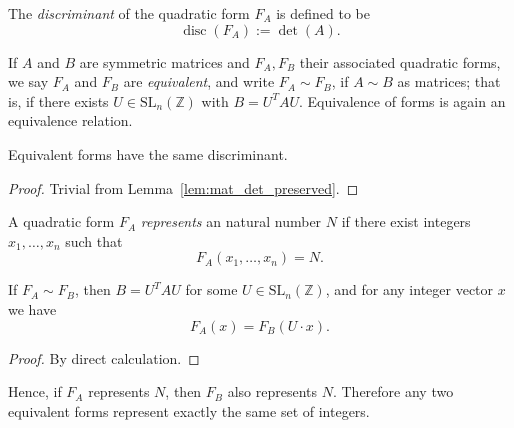 The \emph{discriminant} of the quadratic form $F_A$ is defined to be
\[ \operatorname{disc}(F_A) := \det(A). \]

\begin{definition}
\label{def:QuadMap_equiv}
\leanok
If $A$ and $B$ are symmetric matrices and $F_A, F_B$ their associated
quadratic forms, we say $F_A$ and $F_B$ are \emph{equivalent}, and write
$F_A\sim F_B$, if $A\sim B$ as matrices; that is, if there exists
$U\in\mathrm{SL}_n(\mathbb{Z})$ with $B = U^T A U$.
Equivalence of forms is again an equivalence relation.
\end{definition}

\begin{lemma}
\label{lem:QuadMap_equiv_to_det_eq}
\leanok
Equivalent forms have the same discriminant.
\end{lemma}

\begin{proof}
\leanok
{}
Trivial from Lemma~\ref{lem:mat_det_preserved}.
\end{proof}

\begin{definition}
\label{def:Nat_is_represented_by}
\leanok
A quadratic form $F_A$ \emph{represents} an natural number $N$ if there exist
integers $x_1,\dots,x_n$ such that
\[ F_A(x_1,\dots,x_n) = N. \]
\end{definition}

\begin{lemma}
\label{lem:QuadMap_equiv_apply}
\leanok
If $F_A\sim F_B$, then $B = U^T A U$ for some
$U\in\mathrm{SL}_n(\mathbb{Z})$, and for any integer vector $x$ we have
\[F_A(x) = F_B(U \cdot x).\]
\end{lemma}

\begin{proof}
\leanok
By direct calculation.
\end{proof}

\begin{lemma}
\label{lem:QuadMap_equiv_represents}
\leanok
Hence, if $F_A$ represents $N$, then $F_B$ also represents $N$.
Therefore any two equivalent forms represent exactly the same set of
integers.
\end{lemma}

